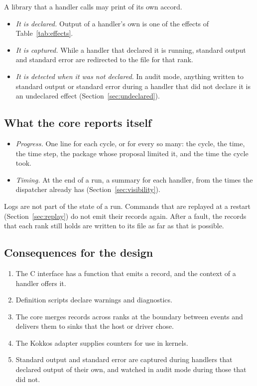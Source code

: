 \documentclass[11pt,a4paper]{article}
\begin{document}
A library that a handler calls may print of its own accord.

\begin{itemize}
  \item \emph{It is declared.}  Output of a handler's own is one of the
        effects of Table~\ref{tab:effects}.
  \item \emph{It is captured.}  While a handler that declared it is running,
        standard output and standard error are redirected to the file for
        that rank.
  \item \emph{It is detected when it was not declared.}  In audit mode,
        anything written to standard output or standard error during a
        handler that did not declare it is an undeclared effect
        (Section~\ref{sec:undeclared}).
\end{itemize}

\subsection{What the core reports itself}

\begin{itemize}
  \item \emph{Progress.}  One line for each cycle, or for every so many: the
        cycle, the time, the time step, the package whose proposal limited
        it, and the time the cycle took.
  \item \emph{Timing.}  At the end of a run, a summary for each handler, from
        the times the dispatcher already has (Section~\ref{sec:visibility}).
\end{itemize}

Logs are not part of the state of a run.  Commands that are replayed at a
restart (Section~\ref{sec:replay}) do not emit their records again.  After
a fault, the records that each rank still holds are written to its file as
far as that is possible.

\subsection{Consequences for the design}

\begin{enumerate}
  \item The C interface has a function that emits a record, and the context
        of a handler offers it.
  \item Definition scripts declare warnings and diagnostics.
  \item The core merges records across ranks at the boundary between events
        and delivers them to sinks that the host or driver chose.
  \item The Kokkos adapter supplies counters for use in kernels.
  \item Standard output and standard error are captured during handlers
        that declared output of their own, and watched in audit mode during
        those that did not.
\end{enumerate}
\end{document}
